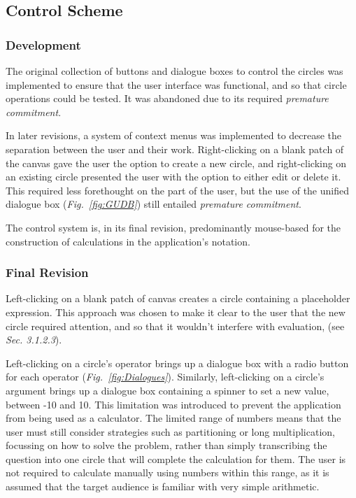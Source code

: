 \documentclass[12pt,twoside,notitlepage,xetex]{report}
\begin{document}
\subsection{Control Scheme}


\subsubsection{Development}

The original collection of buttons and dialogue boxes to control the circles was implemented to ensure that the user interface was functional, and so that circle operations could be tested.  It was abandoned due to its required \emph{premature commitment}.

In later revisions, a system of context menus was implemented to decrease the separation between the user and their work.  Right-clicking on a blank patch of the canvas gave the user the option to create a new circle, and right-clicking on an existing circle presented the user with the option to either edit or delete it.  This required less forethought on the part of the user, but the use of the unified dialogue box (\emph{Fig.~\ref{fig:GUDB}}) still entailed \emph{premature commitment}.

The control system is, in its final revision, predominantly mouse-based for the construction of calculations in the application's notation.

\subsubsection{Final Revision}

Left-clicking on a blank patch of canvas creates a circle containing a placeholder expression.  This approach was chosen to make it clear to the user that the new circle required attention, and so that it wouldn't interfere with evaluation, (see \emph{Sec. 3.1.2.3}).

Left-clicking on a circle's operator brings up a dialogue box with a radio button for each operator (\emph{Fig.~\ref{fig:Dialogues}}).  Similarly, left-clicking on a circle's argument brings up a dialogue box containing a spinner to set a new value, between -10 and 10.  This limitation was introduced to prevent the application from being used as a calculator.  The limited range of numbers means that the user must still consider strategies such as partitioning or long multiplication, focussing on how to solve the problem, rather than simply transcribing the question into one circle that will complete the calculation for them.  The user is not required to calculate manually using numbers within this range, as it is assumed that the target audience is familiar with very simple arithmetic.
\end{document}
